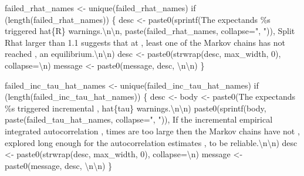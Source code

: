 \documentclass[
  letterpaper,
  DIV=11,
  numbers=noendperiod]{scrartcl}
\newenvironment{Shaded}{\begin{snugshade}}{\end{snugshade}}
\newcommand{\CharTok}[1]{\textcolor[rgb]{0.13,0.47,0.30}{#1}}
\newcommand{\ControlFlowTok}[1]{\textcolor[rgb]{0.00,0.23,0.31}{#1}}
\newcommand{\DecValTok}[1]{\textcolor[rgb]{0.68,0.00,0.00}{#1}}
\newcommand{\NormalTok}[1]{\textcolor[rgb]{0.00,0.23,0.31}{#1}}
\newcommand{\OperatorTok}[1]{\textcolor[rgb]{0.37,0.37,0.37}{#1}}
\newcommand{\SpecialCharTok}[1]{\textcolor[rgb]{0.37,0.37,0.37}{#1}}
\newcommand{\StringTok}[1]{\textcolor[rgb]{0.13,0.47,0.30}{#1}}
\begin{document}
\begin{Shaded}
\begin{Highlighting}[]
\NormalTok{  failed\_rhat\_names }\OperatorTok{\textless{}{-}}\NormalTok{ unique(failed\_rhat\_names)}
  \ControlFlowTok{if}\NormalTok{ (length(failed\_rhat\_names)) \{}
\NormalTok{    desc }\OperatorTok{\textless{}{-}} 
\NormalTok{      paste0(sprintf(}\StringTok{\textquotesingle{}The expectands }\SpecialCharTok{\%s}\StringTok{ triggered hat}\SpecialCharTok{\{R\}}\StringTok{ warnings.}\CharTok{\textbackslash{}n\textbackslash{}n}\StringTok{\textquotesingle{}}\NormalTok{,}
\NormalTok{             paste(failed\_rhat\_names, collapse}\OperatorTok{=}\StringTok{", "}\NormalTok{)),}
             \StringTok{\textquotesingle{}  Split Rhat larger than 1.1 suggests that at \textquotesingle{}}\NormalTok{,}
             \StringTok{\textquotesingle{}least one of the Markov chains has not reached \textquotesingle{}}\NormalTok{,}
             \StringTok{\textquotesingle{}an equilibrium.}\CharTok{\textbackslash{}n\textbackslash{}n}\StringTok{\textquotesingle{}}\NormalTok{)}
\NormalTok{    desc }\OperatorTok{\textless{}{-}}\NormalTok{ paste0(strwrap(desc, max\_width, }\DecValTok{0}\NormalTok{), collapse}\OperatorTok{=}\StringTok{\textquotesingle{}}\CharTok{\textbackslash{}n}\StringTok{\textquotesingle{}}\NormalTok{)}
\NormalTok{    message }\OperatorTok{\textless{}{-}}\NormalTok{ paste0(message, desc, }\StringTok{\textquotesingle{}}\CharTok{\textbackslash{}n\textbackslash{}n}\StringTok{\textquotesingle{}}\NormalTok{)}
\NormalTok{  \}}
  
\NormalTok{  failed\_inc\_tau\_hat\_names }\OperatorTok{\textless{}{-}}\NormalTok{ unique(failed\_inc\_tau\_hat\_names)}
  \ControlFlowTok{if}\NormalTok{ (length(failed\_inc\_tau\_hat\_names)) \{}
\NormalTok{    desc }\OperatorTok{\textless{}{-}}
\NormalTok{      body }\OperatorTok{\textless{}{-}}\NormalTok{ paste0(}\StringTok{\textquotesingle{}The expectands }\SpecialCharTok{\%s}\StringTok{ triggered incremental \textquotesingle{}}\NormalTok{,}
                     \StringTok{\textquotesingle{}hat}\SpecialCharTok{\{tau\}}\StringTok{ warnings.}\CharTok{\textbackslash{}n\textbackslash{}n}\StringTok{\textquotesingle{}}\NormalTok{)}
\NormalTok{      paste0(sprintf(body, paste(failed\_tau\_hat\_names, collapse}\OperatorTok{=}\StringTok{", "}\NormalTok{)),}
             \StringTok{\textquotesingle{}If the incremental empirical integrated autocorrelation \textquotesingle{}}\NormalTok{,}
             \StringTok{\textquotesingle{}times are too large then the Markov chains have not \textquotesingle{}}\NormalTok{,}
             \StringTok{\textquotesingle{}explored long enough for the autocorrelation estimates \textquotesingle{}}\NormalTok{,}
             \StringTok{\textquotesingle{}to be reliable.}\CharTok{\textbackslash{}n\textbackslash{}n}\StringTok{\textquotesingle{}}\NormalTok{)}
\NormalTok{    desc }\OperatorTok{\textless{}{-}}\NormalTok{ paste0(strwrap(desc, max\_width, }\DecValTok{0}\NormalTok{), collapse}\OperatorTok{=}\StringTok{\textquotesingle{}}\CharTok{\textbackslash{}n}\StringTok{\textquotesingle{}}\NormalTok{)}
\NormalTok{    message }\OperatorTok{\textless{}{-}}\NormalTok{ paste0(message, desc, }\StringTok{\textquotesingle{}}\CharTok{\textbackslash{}n\textbackslash{}n}\StringTok{\textquotesingle{}}\NormalTok{)}
\NormalTok{  \}}


\end{Highlighting}
\end{Shaded}
\end{document}
